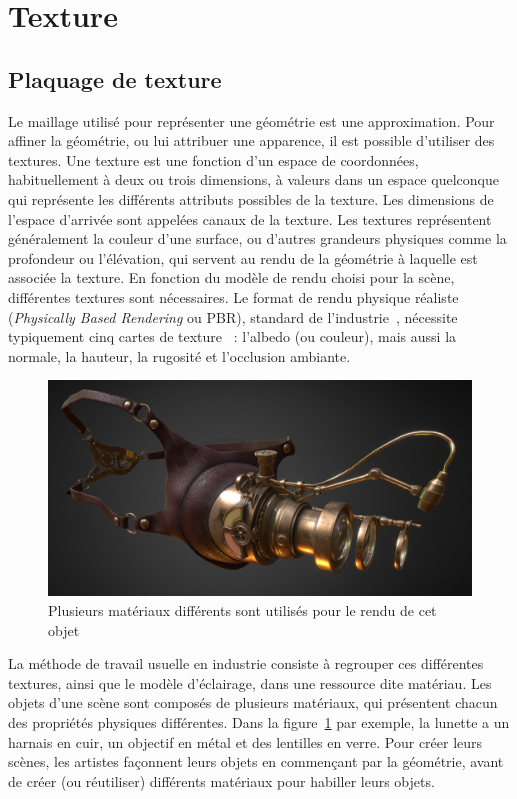 \section{Texture}

\subsection*{Plaquage de texture}

Le maillage utilisé pour représenter une géométrie est une approximation. Pour affiner la géométrie, ou lui attribuer une apparence, il est possible d'utiliser des textures. Une texture est une fonction d'un espace de coordonnées, habituellement à deux ou trois dimensions, à valeurs dans un espace quelconque qui représente les différents attributs possibles de la texture. Les dimensions de l'espace d'arrivée sont appelées canaux de la texture. Les textures représentent généralement la couleur d'une surface, ou d'autres grandeurs physiques comme la profondeur ou l'élévation, qui servent au rendu de la géométrie à laquelle est associée la texture. En fonction du modèle de rendu choisi pour la scène, différentes textures sont nécessaires. Le format de rendu physique réaliste ({\it Physically Based Rendering} ou PBR), standard de l'industrie~\cite{hoffman_siggraph_2010}, nécessite typiquement cinq cartes de texture~\cite{pharr_physically_2023} : l'albedo (ou couleur), mais aussi la normale, la hauteur, la rugosité et l'occlusion ambiante.

\bigskip

\begin{figure}
    \centering
    \includegraphics[width=.65\textwidth]{contenu/resources/images/mutli-material-object}
    \caption[Rendu d'un objet comportant plusieurs matériaux]{Plusieurs matériaux différents sont utilisés pour le rendu de cet objet~\cite{lepkarepka_steampunk_2021}}
    \label{fig:multi-material}
\end{figure}

La méthode de travail usuelle en industrie consiste à regrouper ces différentes textures, ainsi que le modèle d'éclairage, dans une ressource dite matériau. Les objets d'une scène sont composés de plusieurs matériaux, qui présentent chacun des propriétés physiques différentes. Dans la figure~\ref{fig:multi-material} par exemple, la lunette a un harnais en cuir, un objectif en métal et des lentilles en verre. Pour créer leurs scènes, les artistes façonnent leurs objets en commençant par la géométrie, avant de créer (ou réutiliser) différents matériaux pour habiller leurs objets.

